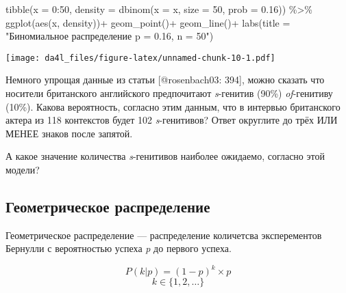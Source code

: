 \documentclass[
]{book}
\makeatletter
\newenvironment{Shaded}{\begin{snugshade}}{\end{snugshade}}
\newcommand{\AttributeTok}[1]{\textcolor[rgb]{0.77,0.63,0.00}{#1}}
\newcommand{\DecValTok}[1]{\textcolor[rgb]{0.00,0.00,0.81}{#1}}
\newcommand{\FloatTok}[1]{\textcolor[rgb]{0.00,0.00,0.81}{#1}}
\newcommand{\FunctionTok}[1]{\textcolor[rgb]{0.00,0.00,0.00}{#1}}
\newcommand{\NormalTok}[1]{#1}
\newcommand{\SpecialCharTok}[1]{\textcolor[rgb]{0.00,0.00,0.00}{#1}}
\newcommand{\StringTok}[1]{\textcolor[rgb]{0.31,0.60,0.02}{#1}}
\newenvironment{kframe}{%
    \medskip{}
    \setlength{\fboxsep}{.8em}
    \def\at@end@of@kframe{}%
    \ifinner\ifhmode%
    \def\at@end@of@kframe{\end{minipage}}%
    \begin{minipage}{\columnwidth}%
    \fi\fi%
    \def\FrameCommand##1{\hskip\@totalleftmargin \hskip-\fboxsep
    \colorbox{shadecolor}{##1}\hskip-\fboxsep
        \hskip-\linewidth \hskip-\@totalleftmargin \hskip\columnwidth}%
    \MakeFramed {\advance\hsize-\width
      \@totalleftmargin\z@ \linewidth\hsize
      \@setminipage}}%
  {\par\unskip\endMakeFramed%
    \at@end@of@kframe}
\newenvironment{rmdblock}[1]
  {
    \begin{itemize}
    \renewcommand{\labelitemi}{
      \raisebox{-.7\height}[0pt][0pt]{
        {\setkeys{Gin}{width=3em,keepaspectratio}\texttt{[image: images/\#1]}}
        }
        }
        \setlength{\fboxsep}{1em}
        \begin{kframe}
        \item
      }
      {
        \end{kframe}
        \end{itemize}
      }
\newenvironment{rmdtask}
      {\begin{rmdblock}{task}}
      {\end{rmdblock}}
\makeatother
\begin{document}
\begin{Shaded}
\begin{Highlighting}[]
\FunctionTok{tibble}\NormalTok{(}\AttributeTok{x =} \DecValTok{0}\SpecialCharTok{:}\DecValTok{50}\NormalTok{,}
       \AttributeTok{density =} \FunctionTok{dbinom}\NormalTok{(}\AttributeTok{x =}\NormalTok{ x, }\AttributeTok{size =} \DecValTok{50}\NormalTok{, }\AttributeTok{prob =} \FloatTok{0.16}\NormalTok{)) }\SpecialCharTok{\%\textgreater{}\%} 
  \FunctionTok{ggplot}\NormalTok{(}\FunctionTok{aes}\NormalTok{(x, density))}\SpecialCharTok{+}
  \FunctionTok{geom\_point}\NormalTok{()}\SpecialCharTok{+}
  \FunctionTok{geom\_line}\NormalTok{()}\SpecialCharTok{+}
  \FunctionTok{labs}\NormalTok{(}\AttributeTok{title =} \StringTok{"Биномиальное распределение p = 0.16, n = 50"}\NormalTok{)}
\end{Highlighting}
\end{Shaded}

\texttt{[image: da4l\_files/figure-latex/unnamed-chunk-10-1.pdf]}

\begin{rmdtask}
Немного упрощая данные из статьи {[}@rosenbach03: 394{]}, можно сказать
что носители британского английского предпочитают \emph{s}-генитив
(90\%) \emph{of}-генитиву (10\%). Какова вероятность, согласно этим
данным, что в интервью британского актера из 118 контекстов будет 102
\emph{s}-генитивов? Ответ округлите до трёх ИЛИ МЕНЕЕ знаков после
запятой.
\end{rmdtask}

\begin{rmdtask}
А какое значение количества \emph{s}-генитивов наиболее ожидаемо,
согласно этой модели?
\end{rmdtask}

\hypertarget{ux433ux435ux43eux43cux435ux442ux440ux438ux447ux435ux441ux43aux43eux435-ux440ux430ux441ux43fux440ux435ux434ux435ux43bux435ux43dux438ux435}{%
\subsection{Геометрическое распределение}\label{ux433ux435ux43eux43cux435ux442ux440ux438ux447ux435ux441ux43aux43eux435-ux440ux430ux441ux43fux440ux435ux434ux435ux43bux435ux43dux438ux435}}

Геометрическое распределение --- распределение количетсва эксперементов Бернулли с вероятностью успеха \emph{p} до первого успеха.

\[P(k | p) = (1-p)^k\times p\]
\[k\in\{1, 2, \dots\}\]
\end{document}
